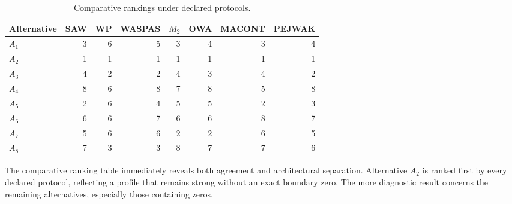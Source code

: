 \documentclass[reqno,11pt]{amsart}
\theoremstyle{definition}
\theoremstyle{plain}
\theoremstyle{remark}
\begin{document}
\begin{table}[htbp]
\centering
\scriptsize
\caption{Method-specific scores under declared protocols.}
\label{tab:benchmark-scores}
\end{table}

\begin{table}[htbp]
\centering
\small
\caption{Comparative rankings under declared protocols.}
\label{tab:benchmark-rankings}
\begin{tabular}{lrrrrrrr}
\toprule
Alternative & SAW & WP & WASPAS & $M_2$ & OWA & MACONT & PEJWAK\\
\midrule
$A_1$&3&6&5&3&4&3&4\\
$A_2$&1&1&1&1&1&1&1\\
$A_3$&4&2&2&4&3&4&2\\
$A_4$&8&6&8&7&8&5&8\\
$A_5$&2&6&4&5&5&2&3\\
$A_6$&6&6&7&6&6&8&7\\
$A_7$&5&6&6&2&2&6&5\\
$A_8$&7&3&3&8&7&7&6\\
\bottomrule
\end{tabular}
\end{table}

The comparative ranking table immediately reveals both agreement and
architectural separation. Alternative \(A_2\) is ranked first by every
declared protocol, reflecting a profile that remains strong without an
exact boundary zero. The more diagnostic result concerns the remaining
alternatives, especially those containing zeros.
\end{document}
